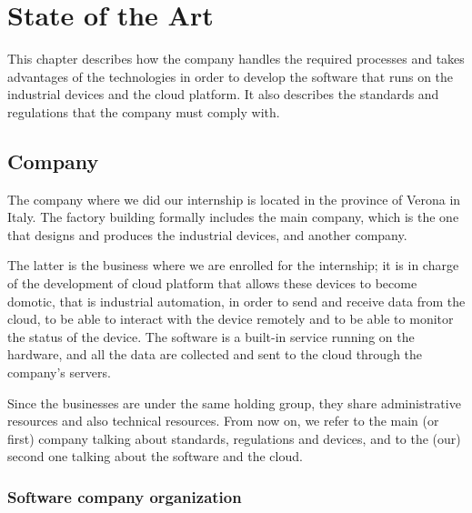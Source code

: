 \chapter{State of the Art}

This chapter describes how the company handles the required processes and takes advantages of the technologies in order to develop the software that runs on the industrial devices and the cloud platform. It also describes the standards and regulations that the company must comply with.

\section{Company}

The company where we did our internship is located in the province of Verona in Italy. The factory building formally includes the main company, which is the one that designs and produces the industrial devices, and another company.

The latter is the business where we are enrolled for the internship; it is in charge of the development of cloud platform that allows these devices to become domotic, that is industrial automation, in order to send and receive data from the cloud, to be able to interact with the device remotely and to be able to monitor the status of the device. The software is a built-in service running on the hardware, and all the data are collected and sent to the cloud through the company's servers.

Since the businesses are under the same holding group, they share administrative resources and also technical resources. From now on, we refer to the main (or first) company talking about standards, regulations and devices, and to the (our) second one talking about the software and the cloud.

\subsection{Software company organization}

